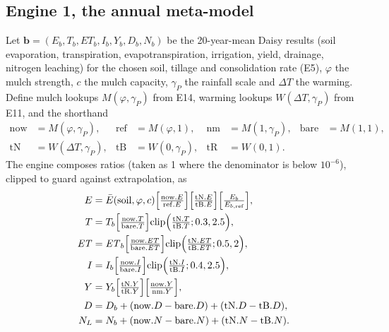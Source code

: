 \documentclass[preprint,12pt]{elsarticle}
\begin{document}
\subsection{Engine 1, the annual meta-model}
Let $\mathbf b=(E_b,T_b,\mathit{ET}_b,I_b,Y_b,D_b,N_b)$ be the 20-year-mean Daisy results (soil evaporation, transpiration, evapotranspiration, irrigation, yield, drainage, nitrogen leaching) for the chosen soil, tillage and consolidation rate (E5), $\varphi$ the mulch strength, $c$ the mulch capacity, $\gamma_P$ the rainfall scale and $\Delta T$ the warming. Define mulch lookups $M(\varphi,\gamma_P)$ from E14, warming lookups $W(\Delta T,\gamma_P)$ from E11, and the shorthand
\begin{equation}
\begin{aligned}\mathrm{now}&=M(\varphi,\gamma_P),& \mathrm{ref}&=M(\varphi,1),& \mathrm{nm}&=M(1,\gamma_P),& \mathrm{bare}&=M(1,1),\\ \mathrm{tN}&=W(\Delta T,\gamma_P),& \mathrm{tB}&=W(0,\gamma_P),& \mathrm{tR}&=W(0,1).\end{aligned}
\end{equation}
The engine composes ratios (taken as 1 where the denominator is below $10^{-6}$), clipped to guard against extrapolation, as
\begin{align}
E&=\bar E(\mathrm{soil},\varphi,c)\Bigl[\tfrac{\mathrm{now}.E}{\mathrm{ref}.E}\Bigr]\Bigl[\tfrac{\mathrm{tN}.E}{\mathrm{tB}.E}\Bigr]\Bigl[\tfrac{E_b}{E_{b,\mathrm{ref}}}\Bigr],\label{eq:E1E}\\
T&=T_b\Bigl[\tfrac{\mathrm{now}.T}{\mathrm{bare}.T}\Bigr]\mathrm{clip}\Bigl(\tfrac{\mathrm{tN}.T}{\mathrm{tB}.T};0.3,2.5\Bigr),\label{eq:E1T}\\
\mathit{ET}&=\mathit{ET}_b\Bigl[\tfrac{\mathrm{now}.\mathit{ET}}{\mathrm{bare}.\mathit{ET}}\Bigr]\mathrm{clip}\Bigl(\tfrac{\mathrm{tN}.\mathit{ET}}{\mathrm{tB}.\mathit{ET}};0.5,2\Bigr),\label{eq:E1ET}\\
I&=I_b\Bigl[\tfrac{\mathrm{now}.I}{\mathrm{bare}.I}\Bigr]\mathrm{clip}\Bigl(\tfrac{\mathrm{tN}.I}{\mathrm{tB}.I};0.4,2.5\Bigr),\label{eq:E1I}\\
Y&=Y_b\Bigl[\tfrac{\mathrm{tN}.Y}{\mathrm{tR}.Y}\Bigr]\Bigl[\tfrac{\mathrm{now}.Y}{\mathrm{nm}.Y}\Bigr],\label{eq:E1Y}\\
D&=D_b+(\mathrm{now}.D-\mathrm{bare}.D)+(\mathrm{tN}.D-\mathrm{tB}.D),\label{eq:E1D}\\
N_L&=N_b+(\mathrm{now}.N-\mathrm{bare}.N)+(\mathrm{tN}.N-\mathrm{tB}.N).\label{eq:E1N}
\end{align}
\end{document}
